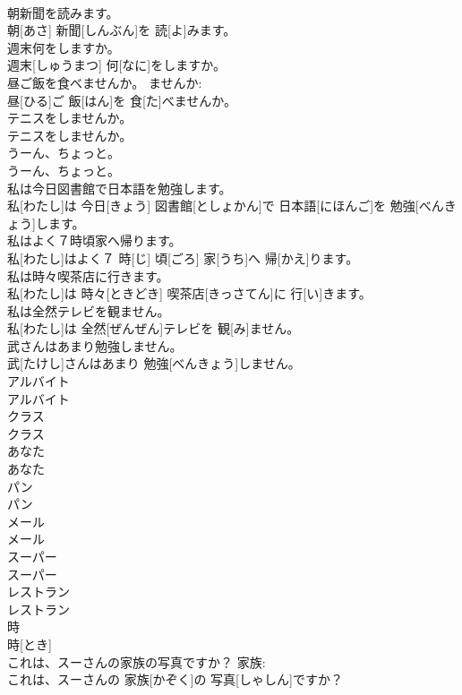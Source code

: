 \documentclass[8pt]{extreport}
\begin{document}
\begin{CJK}{UTF8}{min}
\\	朝新聞を読みます。	
\\	朝[あさ] 新聞[しんぶん]を 読[よ]みます。	
\\	週末何をしますか。	
\\	週末[しゅうまつ] 何[なに]をしますか。	
\\	昼ご飯を食べませんか。	ませんか: 
\\	昼[ひる]ご 飯[はん]を 食[た]べませんか。	
\\	テニスをしませんか。	
\\	テニスをしませんか。	
\\	うーん、ちょっと。	
\\	うーん、ちょっと。	
\\	私は今日図書館で日本語を勉強します。	
\\	私[わたし]は 今日[きょう] 図書館[としょかん]で 日本語[にほんご]を 勉強[べんきょう]します。	
\\	私はよく７時頃家へ帰ります。	
\\	私[わたし]はよく７ 時[じ] 頃[ごろ] 家[うち]へ 帰[かえ]ります。	
\\	私は時々喫茶店に行きます。	
\\	私[わたし]は 時々[ときどき] 喫茶店[きっさてん]に 行[い]きます。	
\\	私は全然テレビを観ません。	
\\	私[わたし]は 全然[ぜんぜん]テレビを 観[み]ません。	
\\	武さんはあまり勉強しません。	
\\	武[たけし]さんはあまり 勉強[べんきょう]しません。	
\\	アルバイト	
\\	アルバイト		
\\	クラス	
\\	クラス		
\\	あなた	
\\	あなた		
\\	パン	
\\	パン		
\\	メール	
\\	メール		
\\	スーパー	
\\	スーパー		
\\	レストラン	
\\	レストラン		
\\	時	
\\	時[とき]		
\\	これは、スーさんの家族の写真ですか？	家族: 
\\	これは、スーさんの 家族[かぞく]の 写真[しゃしん]ですか？		

\end{CJK}
\end{document}
